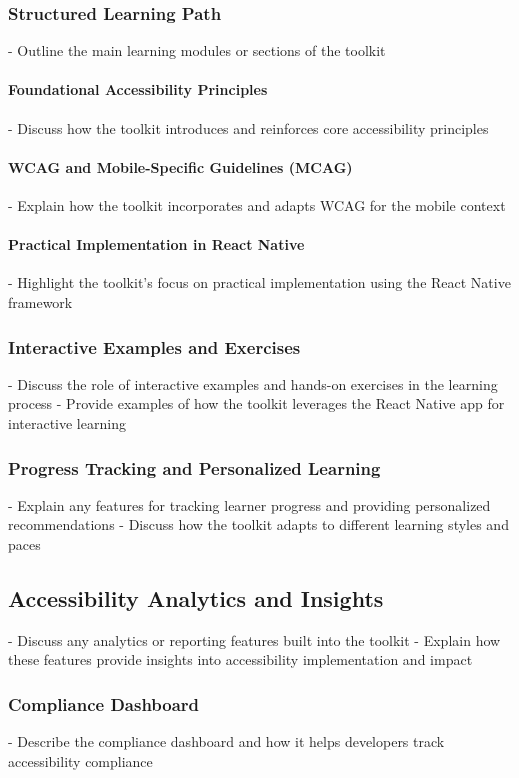 \subsubsection{Structured Learning Path}
- Outline the main learning modules or sections of the toolkit

\paragraph{Foundational Accessibility Principles}
- Discuss how the toolkit introduces and reinforces core accessibility principles

\paragraph{WCAG and Mobile-Specific Guidelines (MCAG)}
- Explain how the toolkit incorporates and adapts WCAG for the mobile context

\paragraph{Practical Implementation in React Native}
- Highlight the toolkit's focus on practical implementation using the React Native framework

\subsubsection{Interactive Examples and Exercises}
- Discuss the role of interactive examples and hands-on exercises in the learning process
- Provide examples of how the toolkit leverages the React Native app for interactive learning

\subsubsection{Progress Tracking and Personalized Learning}
- Explain any features for tracking learner progress and providing personalized recommendations
- Discuss how the toolkit adapts to different learning styles and paces

\subsection{Accessibility Analytics and Insights}
- Discuss any analytics or reporting features built into the toolkit
- Explain how these features provide insights into accessibility implementation and impact

\subsubsection{Compliance Dashboard}
- Describe the compliance dashboard and how it helps developers track accessibility compliance

